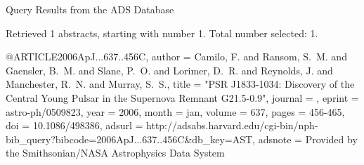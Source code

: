 Query Results from the ADS Database


Retrieved 1 abstracts, starting with number 1.  Total number selected: 1.

@ARTICLE{2006ApJ...637..456C,
   author = {{Camilo}, F. and {Ransom}, S.~M. and {Gaensler}, B.~M. and {Slane}, P.~O. and 
	{Lorimer}, D.~R. and {Reynolds}, J. and {Manchester}, R.~N. and 
	{Murray}, S.~S.},
    title = "{PSR J1833-1034: Discovery of the Central Young Pulsar in the Supernova Remnant G21.5-0.9}",
  journal = {\apj},
   eprint = {astro-ph/0509823},
     year = 2006,
    month = jan,
   volume = 637,
    pages = {456-465},
      doi = {10.1086/498386},
   adsurl = {http://adsabs.harvard.edu/cgi-bin/nph-bib_query?bibcode=2006ApJ...637..456C&db_key=AST},
  adsnote = {Provided by the Smithsonian/NASA Astrophysics Data System}
}


